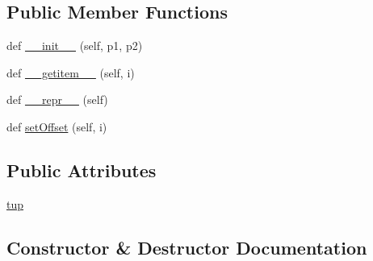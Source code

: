 \subsection*{Public Member Functions}
\begin{DoxyCompactItemize}
\item 
def \hyperlink{classpkg__resources_1_1__vendor_1_1pyparsing_1_1__ParseResultsWithOffset_a79050bbc59aea16482a64483b54f3238}{\+\_\+\+\_\+init\+\_\+\+\_\+} (self, p1, p2)
\item 
def \hyperlink{classpkg__resources_1_1__vendor_1_1pyparsing_1_1__ParseResultsWithOffset_afc6ea50dfa25c70b0736b537d52bf417}{\+\_\+\+\_\+getitem\+\_\+\+\_\+} (self, i)
\item 
def \hyperlink{classpkg__resources_1_1__vendor_1_1pyparsing_1_1__ParseResultsWithOffset_a66989c01419887a1c05c26e871278dcd}{\+\_\+\+\_\+repr\+\_\+\+\_\+} (self)
\item 
def \hyperlink{classpkg__resources_1_1__vendor_1_1pyparsing_1_1__ParseResultsWithOffset_a97fbc26cda03a043af01ff21cc427916}{set\+Offset} (self, i)
\end{DoxyCompactItemize}
\subsection*{Public Attributes}
\begin{DoxyCompactItemize}
\item 
\hyperlink{classpkg__resources_1_1__vendor_1_1pyparsing_1_1__ParseResultsWithOffset_ad6b4d6651d9ba758c96dd138b5774e87}{tup}
\end{DoxyCompactItemize}


\subsection{Constructor \& Destructor Documentation}
\mbox{\label{classpkg__resources_1_1__vendor_1_1pyparsing_1_1__ParseResultsWithOffset_a79050bbc59aea16482a64483b54f3238}} 
